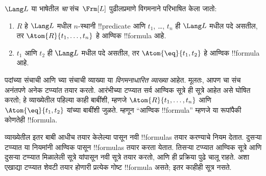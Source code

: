 \documentclass[../../../include/open-logic-section]{subfiles}
\begin{document}
\begin{defn}[सूत्रे]
$\Lang L$ या भाषेतील \emph{चा} संच~$\Frm[L]$
पुढीलप्रमाणे विगमनाने परिभाषित केला जातो:
\begin{enumerate}


\item $R$ हे $\Lang L$ मधील $n$-स्थानी !!{predicate} आणि $t_1$, \dots,
  $t_n$ ही $\Lang L$ मधील पदे असतील, तर $\Atom{R}{t_1,\ldots, t_n}$ हे
  आण्विक !!{formula} आहे.

\item $t_1$ आणि $t_2$ ही $\Lang L$ मधील पदे असतील, तर $\Atom{\eq}{t_1, t_2}$
  हे आण्विक !!{formula} आहे.








\end{enumerate}
\end{defn}

\begin{explain}
पदांच्या संचाची आणि च्या संचाची व्याख्या या
\emph{विगमनाधारित व्याख्या} आहेत. मूलतः, आपण चा संच
अनंतपणे अनेक टप्प्यांत तयार करतो. आरंभीच्या टप्प्यात सर्व आण्विक सूत्रे
ही सूत्रे आहेत असे घोषित करतो; हे व्याख्येतील पहिल्या काही बाबींशी,
म्हणजे
%
%
$\Atom{R}{t_1,\dots,t_n}$ आणि $\Atom{\eq}{t_1,t_2}$ यांच्या बाबींशी जुळते.
म्हणून ``आण्विक !!{formula}'' म्हणजे या रूपांपैकी कोणतेही !!{formula}.

व्याख्येतील इतर बाबी आधीच तयार केलेल्या पासून नवी
!!{formula}s तयार करण्याचे नियम देतात. दुसऱ्या टप्प्यात या नियमांनी
आण्विक पासून !!{formula}s तयार करता येतात. तिसऱ्या
टप्प्यात आण्विक सूत्रे आणि दुसऱ्या टप्प्यात मिळालेली सूत्रे यांपासून
नवी सूत्रे तयार करतो, आणि ही प्रक्रिया पुढे चालू राहते. अशा एखाद्या
टप्प्यात शेवटी तयार होणारी प्रत्येक गोष्ट !!{formula} असते; इतर
काहीही सूत्र नसते.
\end{explain}
\end{document}
